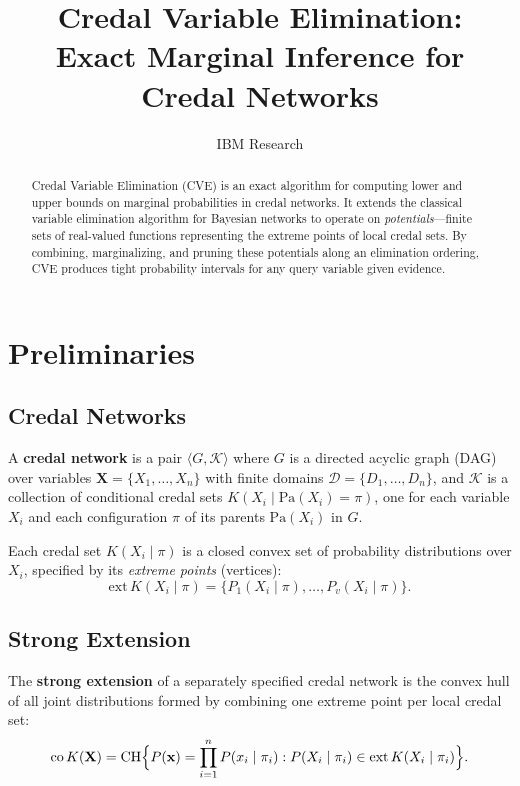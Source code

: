 \documentclass[11pt]{article}
\title{Credal Variable Elimination:\\Exact Marginal Inference for Credal Networks}
\author{IBM Research}
\date{}
\begin{document}
\maketitle

\begin{abstract}
Credal Variable Elimination (CVE) is an exact algorithm for computing lower and upper
bounds on marginal probabilities in credal networks. It extends the classical variable
elimination algorithm for Bayesian networks to operate on \emph{potentials}---finite
sets of real-valued functions representing the extreme points of local credal sets.
By combining, marginalizing, and pruning these potentials along an elimination ordering,
CVE produces tight probability intervals for any query variable given evidence.
\end{abstract}

\section{Preliminaries}

\subsection{Credal Networks}

A \textbf{credal network} is a pair $\langle G, \mathcal{K} \rangle$ where $G$ is a
directed acyclic graph (DAG) over variables $\mathbf{X} = \{X_1, \dots, X_n\}$ with
finite domains $\mathcal{D} = \{D_1, \dots, D_n\}$, and $\mathcal{K}$ is a collection
of conditional credal sets $K(X_i \mid \mathrm{Pa}(X_i) = \pi)$, one for each variable
$X_i$ and each configuration $\pi$ of its parents $\mathrm{Pa}(X_i)$ in $G$.

Each credal set $K(X_i \mid \pi)$ is a closed convex set of probability distributions
over $X_i$, specified by its \emph{extreme points} (vertices):
\[
  \mathrm{ext}\, K(X_i \mid \pi) = \{P_1(X_i \mid \pi), \dots, P_{v}(X_i \mid \pi)\}.
\]

\subsection{Strong Extension}

The \textbf{strong extension} of a separately specified credal network is the convex
hull of all joint distributions formed by combining one extreme point per local credal
set:
\begin{equation}\label{eq:strong-ext}
  \mathrm{co}\,K(\mathbf{X}) = \mathrm{CH}\Bigl\{
    P(\mathbf{x}) = \prod_{i=1}^{n} P(x_i \mid \pi_i) :
    P(X_i \mid \pi_i) \in \mathrm{ext}\,K(X_i \mid \pi_i)
  \Bigr\}.
\end{equation}
\end{document}

